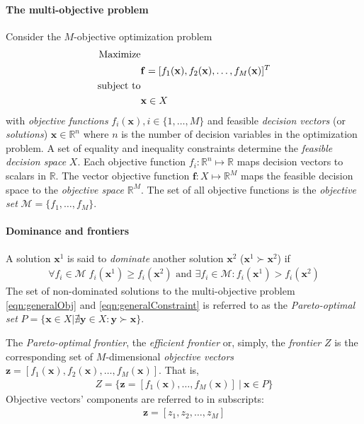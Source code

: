 \paragraph{The multi-objective problem}
Consider the $M$-objective optimization problem
\begin{align}
\text{Maximize}& \notag \\
& \mathbf{f} = [f_1(\mathbf{x}), f_2(\mathbf{x}), \ldots, f_M(\mathbf{x}) ]^T \label{eqn:generalObj}\\
\text{subject to}& \notag \\
& \mathbf{x} \in X \label{eqn:generalConstraint}
\end{align}
with \textit{objective functions} $f_i(\mathbf{x}), i \in \{1,\ldots,M\}$ and feasible \textit{decision vectors} (or \textit{solutions}) $\mathbf{x} \in \mathbb{R}^n$ where $n$ is the number of decision variables in the optimization problem. A set of equality and inequality constraints determine the \textit{feasible decision space} $X$. Each objective function $f_i : \mathbb{R}^n \mapsto \mathbb{R}$ maps decision vectors to scalars in $\mathbb{R}$. The vector objective function $\mathbf{f} : X \mapsto \mathbb{R}^M$ maps the feasible decision space to the \textit{objective space} $\mathbb{R}^M$. The set of all objective functions is the \textit{objective set} $\mathcal{M} = \{f_1,\ldots,f_M\}$.

\paragraph{Dominance and frontiers}
A solution $\mathbf{x}^1$ is said to \textit{dominate} another solution $\mathbf{x}^2$ ($\mathbf{x}^1 \succ \mathbf{x}^2$) if
\begin{align}
\forall f_i \in \mathcal{M} \; f_i(\mathbf{x}^1) \ge f_i(\mathbf{x}^2) \text{ and } \exists f_i \in \mathcal{M} : f_i(\mathbf{x}^1) > f_i(\mathbf{x}^2)
\end{align}
The set of non-dominated solutions to the multi-objective problem \eqref{eqn:generalObj} and \eqref{eqn:generalConstraint} is referred to as the \textit{Pareto-optimal set} $P = \{\mathbf{x} \in X | \nexists \mathbf{y} \in X : \mathbf{y} \succ \mathbf{x} \}$.

The \textit{Pareto-optimal frontier}, the \textit{efficient frontier} or, simply, the \textit{frontier} $Z$ is the corresponding set of $M$-dimensional \textit{objective vectors} $\mathbf{z} = [f_1(\mathbf{x}),f_2(\mathbf{x}),\ldots,f_M(\mathbf{x})]$. That is,
\begin{align}
Z = \{\mathbf{z} = [f_1(\mathbf{x}),\ldots,f_M(\mathbf{x})] \:|\: \mathbf{x} \in P\}
\end{align}
Objective vectors' components are referred to in subscripts:
\begin{align}
\mathbf{z} = [z_1, z_2, \ldots, z_M]
\end{align}

